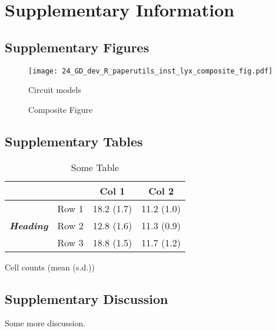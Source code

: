 \documentclass[11pt,british,super,sort&compress]{article}
\providecommand{\tabularnewline}{\\}
\begin{document}
\section{Supplementary Information}


\subsection{Supplementary Figures}

\begin{figure}[H]
\begin{centering}
\texttt{[image: 24\_GD\_dev\_R\_paperutils\_inst\_lyx\_composite\_fig.pdf]}
\par\end{centering}

\begin{centering}
\caption{\label{fig:S_wtCartoons}Composite Figure}

\par\end{centering}

{\footnotesize Circuit models }
\end{figure}


\clearpage{}


\subsection{Supplementary Tables}

\begin{table}[h]
\begin{centering}
\caption{\textbf{\label{tab:S_cellcounts}}Some Table}

\par\end{centering}

\vspace{0.5cm}


\begin{centering}
\begin{tabular}{|c|c|c|c|}
\cline{3-4} 
\multicolumn{2}{c|}{} &
\textbf{Col 1} &
\textbf{Col 2}\tabularnewline
\hline 
\multirow{3}{*}{\textbf{\emph{Heading}}} &
Row 1 &
18.2 (1.7) &
11.2 (1.0)\tabularnewline
\cline{2-4} 
 & Row 2 &
12.8 (1.6) &
11.3 (0.9)\tabularnewline
\cline{2-4} 
 & Row 3 &
18.8 (1.5) &
11.7 (1.2)\tabularnewline
\hline 
\end{tabular}
\par\end{centering}

\vspace{0.5cm}


{\footnotesize Cell counts (mean (s.d.))}
\end{table}
\clearpage{}


\subsection{Supplementary Discussion}

Some more discussion.
\end{document}
